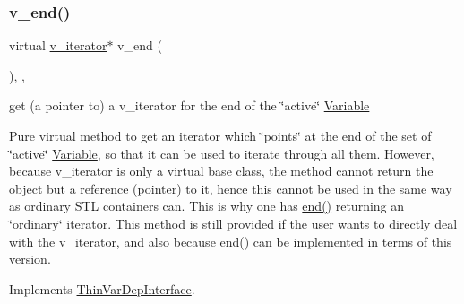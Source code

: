 \subsubsection{\texorpdfstring{v\+\_\+end()}{v\_end()}\hspace{0.1cm}{\footnotesize\ttfamily [1/2]}}
{\footnotesize\ttfamily virtual \mbox{\hyperlink{class_s_m_spp__di__unipi__it_1_1_thin_var_dep_interface_1_1v__iterator}{v\+\_\+iterator}}$\ast$ v\+\_\+end (\begin{DoxyParamCaption}\item[{void}]{ }\end{DoxyParamCaption})\hspace{0.3cm}{\ttfamily [inline]}, {\ttfamily [override]}, {\ttfamily [virtual]}}



get (a pointer to) a v\+\_\+iterator for the end of the \char`\"{}active\char`\"{} \mbox{\hyperlink{class_s_m_spp__di__unipi__it_1_1_variable}{Variable}} 

Pure virtual method to get an iterator which \char`\"{}points\char`\"{} at the end of the set of \char`\"{}active\char`\"{} \mbox{\hyperlink{class_s_m_spp__di__unipi__it_1_1_variable}{Variable}}, so that it can be used to iterate through all them. However, because v\+\_\+iterator is only a virtual base class, the method cannot return the object but a reference (pointer) to it, hence this cannot be used in the same way as ordinary S\+TL containers can. This is why one has \mbox{\hyperlink{group___thin_var_dep_interface___c_l_a_s_s_e_s_gae1175d5cbc6627e3e49ed9bcb58ffce9}{end()}} returning an \char`\"{}ordinary\char`\"{} iterator. This method is still provided if the user wants to directly deal with the v\+\_\+iterator, and also because \mbox{\hyperlink{group___thin_var_dep_interface___c_l_a_s_s_e_s_gae1175d5cbc6627e3e49ed9bcb58ffce9}{end()}} can be implemented in terms of this version. 

Implements \mbox{\hyperlink{group___thin_var_dep_interface___c_l_a_s_s_e_s_ga422dd4393326b2da21dbef0aa0a85bee}{Thin\+Var\+Dep\+Interface}}.

\mbox{\label{class_s_m_spp__di__unipi__it_1_1_f_real_objective_a17969277c912e791df025c9bebda3217}} 
